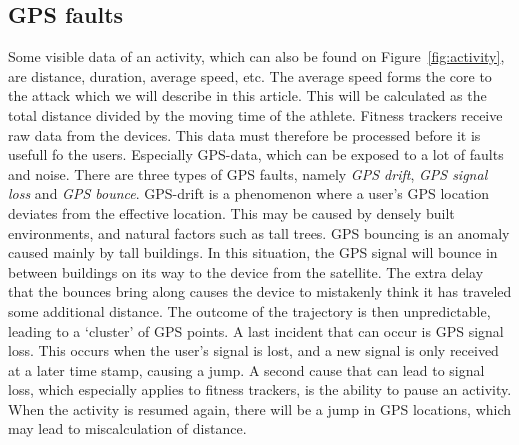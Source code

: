 \documentclass[conference]{IEEEtran}
\begin{document}
\subsection{GPS faults}
Some visible data of an activity, which can also be found on
Figure~\ref{fig:activity}, are distance, duration, average speed, etc. The
average speed forms the core to the attack which we will describe in this
article. This will be calculated as the total distance divided by the moving
time of the athlete. Fitness trackers receive raw data from the devices. This
data must therefore be processed before it is usefull fo the users. Especially
GPS-data, which can be exposed to a lot of faults and noise. There are three
types of GPS faults, namely \textit{GPS drift}, \textit{GPS signal loss} and
\textit{GPS bounce}. GPS-drift is a phenomenon where a user's GPS location
deviates from the effective location. This may be caused by densely built
environments, and natural factors such as tall trees. GPS bouncing is an
anomaly caused mainly by tall buildings. In this situation, the GPS signal will
bounce in between buildings on its way to the device from the satellite. The
extra delay that the bounces bring along causes the device to mistakenly think
it has traveled some additional distance. The outcome of the trajectory is then
unpredictable, leading to a `cluster' of GPS points. A last incident that can
occur is GPS signal loss. This occurs when the user's signal is lost, and a new
signal is only received at a later time stamp, causing a jump. A second cause
that can lead to signal loss, which especially applies to fitness trackers, is
the ability to pause an activity. When the activity is resumed again, there
will be a jump in GPS locations, which may lead to miscalculation of distance.
\end{document}
